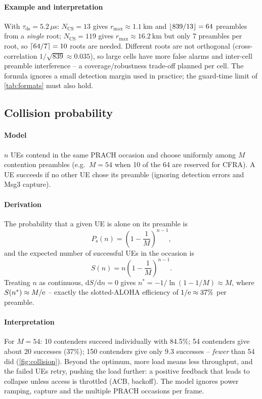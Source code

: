 \documentclass[11pt,a4paper]{article}
\begin{document}
\paragraph{Example and interpretation} With $\tau_{\mathrm{ds}} = 5.2\,\mu$s: $N_{\mathrm{CS}} = 13$ gives
$r_{\max} \approx \qty{1.1}{\kilo\metre}$ and $\left\lfloor 839/13\right\rfloor = 64$ preambles from a \emph{single} root;
$N_{\mathrm{CS}} = 119$ gives $r_{\max}\approx\qty{16.2}{\kilo\metre}$ but only 7 preambles per root, so
$\left\lceil 64/7\right\rceil = 10$ roots are needed. Different roots are not orthogonal (cross-correlation
$1/\sqrt{839}\approx0.035$), so large cells have more false alarms and inter-cell preamble interference --
a coverage/robustness trade-off planned per cell. The formula ignores a small detection margin used in
practice; the guard-time limit of \cref{tab:formats} must also hold.

\subsection{Collision probability}\label{sec:collision}
\paragraph{Model} $n$ UEs contend in the same PRACH occasion and choose uniformly among $M$ contention
preambles (e.g.\ $M = 54$ when 10 of the 64 are reserved for CFRA). A UE succeeds if no other UE chose its
preamble (ignoring detection errors and Msg3 capture).
\paragraph{Derivation} The probability that a given UE is alone on its preamble is
\begin{equation}\label{eq:psucc}
  P_\mathrm{s}(n) = \left(1-\frac{1}{M}\right)^{n-1},
\end{equation}
and the expected number of successful UEs in the occasion is
\begin{equation}\label{eq:nsucc}
  S(n) = n\left(1-\frac{1}{M}\right)^{n-1}.
\end{equation}
Treating $n$ as continuous, $\mathrm{d}S/\mathrm{d}n = 0$ gives $n^\ast = -1/\ln(1-1/M)\approx M$, where
$S(n^\ast)\approx M/\mathrm{e}$ -- exactly the slotted-ALOHA efficiency of $1/\mathrm{e}\approx37\%$ per preamble.
\paragraph{Interpretation} For $M = 54$: 10 contenders succeed individually with 84.5\%; 54 contenders give
about 20 successes (37\%); 150 contenders give only 9.3 successes -- \emph{fewer} than 54 did
(\cref{fig:collision}). Beyond the optimum, more load means less throughput, and the failed UEs retry,
pushing the load further: a positive feedback that leads to collapse unless access is throttled (ACB,
backoff). The model ignores power ramping, capture and the multiple PRACH occasions per frame.
\end{document}
